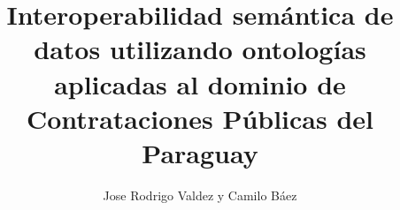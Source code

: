 \documentclass[final,fmstyle]{util/ucathesis}
\title{Interoperabilidad semántica de datos utilizando ontologías aplicadas al dominio de Contrataciones Públicas del Paraguay}
\author{Jose Rodrigo Valdez y Camilo Báez}
\begin{document}
\maketitle     %






\renewcommand{\lstlistingname}{Cuadro}
\renewcommand{\lstlistlistingname}{Índice de \lstlistingname s}

\tableofcontents
\listoffigures
\listoftables
\newpage
\renewcommand\lstlistlistingname{Índice de Cuadros}
 \lstlistoflistings
 




\listofsymbols


\mainmatter  %







%


% 
 

\appendix   %
	
% 
\printbibliography
\end{document}
